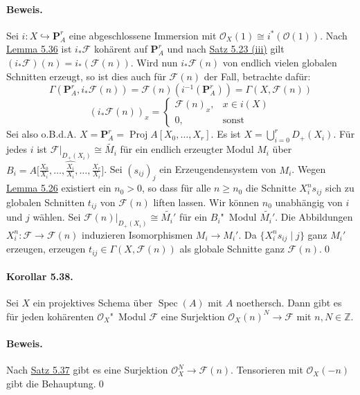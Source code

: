 \paragraph{Beweis.} Sei $i:X\hookrightarrow \mathbf{P}_A^r$ eine abgeschlossene Immersion mit $\mathcal{O}_X(1)\cong i^\ast(\mathcal{O}(1))$. Nach \hyperref[5.36]{Lemma 5.36} ist $i_\ast\mathcal{F}$ kohärent auf $\mathbf{P}_A^r$ und nach \hyperref[5.23]{Satz 5.23 (iii)} gilt $(i_\ast\mathcal{F})(n)=i_\ast(\mathcal{F}(n))$. Wird nun $i_\ast\mathcal{F}(n)$ von endlich vielen globalen Schnitten erzeugt, so ist dies auch für $\mathcal{F}(n)$ der Fall, betrachte dafür:
\[\Gamma(\mathbf{P}_A^r, i_\ast\mathcal{F}(n)) = \mathcal{F}(n)(i^{-1}(\mathbf{P}_A^r))=\Gamma(X,\mathcal{F}(n)) \]
\[(i_\ast\mathcal{F}(n))_x = \begin{cases}
\mathcal{F}(n)_x, & x\in i(X)\\
0, &\text{sonst}
\end{cases} \]
Sei also o.B.d.A. $X=\mathbf{P}_A^r=\operatorname{Proj}A[X_0,\ldots,X_r]$. Es ist $X=\bigcup_{i=0}^r D_+(X_i)$. Für jedes $i$ ist $\mathcal{F}|_{D_+(X_i)}\cong\widetilde{M_i}$ für ein endlich erzeugter Modul $M_i$ über $B_i=A\big[\frac{X_0}{X_i},\ldots,\widehat{\frac{X_i}{X_i}},\ldots,\frac{X_r}{X_i}\big]$. Sei $(s_{ij})_j$ ein Erzeugendensystem von $M_i$. Wegen \hyperref[5.26]{Lemma 5.26} existiert ein $n_0>0$, so dass für alle $n\geq n_0$ die Schnitte $X_i^ns_{ij}$ sich zu globalen Schnitten $t_{ij}$ von $\mathcal{F}(n)$ liften lassen. Wir können $n_0$ unabhängig von $i$ und $j$ wählen. Sei $\mathcal{F}(n)|_{D_+(X_i)}\cong\widetilde{M_i'}$ für ein $B_i$"~Modul $\widetilde{M_i'}$. Die Abbildungen $X_i^n:\mathcal{F}\to\mathcal{F}(n)$ induzieren Isomorphismen $M_i\to M_i'$. Da $\{X_i^ns_{ij}\mid j\}$ ganz $M_i'$ erzeugen, erzeugen $t_{ij}\in\Gamma(X,\mathcal{F}(n))$ als globale Schnitte ganz $\mathcal{F}(n)$.\qed

\paragraph{Korollar 5.38.}\label{5.38} Sei $X$ ein projektives Schema über $\operatorname{Spec}(A)$ mit $A$ noethersch. Dann gibt es für jeden kohärenten $\mathcal{O}_X$"~Modul $\mathcal{F}$ eine Surjektion $\mathcal{O}_X(n)^N\to\mathcal{F}$ mit $n,N\in\mathbb{Z}$.

\paragraph{Beweis.} Nach \hyperref[5.37]{Satz 5.37} gibt es eine Surjektion $\mathcal{O}_X^N\to\mathcal{F}(n)$. Tensorieren mit $\mathcal{O}_X(-n)$ gibt die Behauptung.\qed

